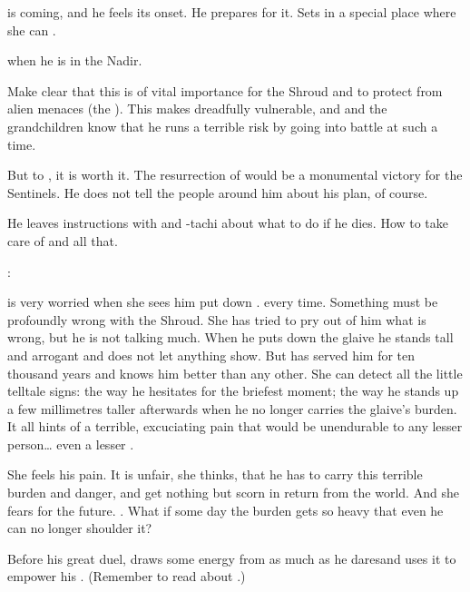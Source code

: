  is coming, and he feels its onset. 
He prepares for it. 
Sets \Rystessakhin{} in a special place where she can . 

\Ishnaruchaefir {} when he is in the Nadir. 

Make clear that this is of vital importance for the Shroud and to protect \Miith{} from alien menaces (the \banes). 
This makes \Ishnaruchaefir{} dreadfully vulnerable, and \Criseis{} and the grandchildren know that he runs a terrible risk by going into battle at such a time. 

But to \Ishnaruchaefir, it is worth it. 
The resurrection of \Nithdornazsh{} would be a monumental victory for the Sentinels. 
He does not tell the people around him about his plan, of course. 

He leaves instructions with \Criseis{} and \Thiencaste-tachi about what to do if he dies. 
How to take care of \Rystessakhin{} and all that. 

\Ishnaruchaefir: 

\Criseis{} is very worried when she sees him put down \Rystessakhin. 
 every time. 
Something must be profoundly wrong with the Shroud. 
She has tried to pry out of him what is wrong, but he is not talking much. 
When he puts down the glaive he stands tall and arrogant and does not let anything show. 
But \Criseis{} has served him for ten thousand years and knows him better than any other. 
She can detect all the little telltale signs: 
the way he hesitates for the briefest moment; the way he stands up a few millimetres taller afterwards when he no longer carries the glaive's burden. 
It all hints of a terrible, excuciating pain that would be unendurable to any lesser person\ldots{} even a lesser \dragon. 

She feels his pain. 
It is unfair, she thinks, that he has to carry this terrible burden and danger, and get nothing but scorn in return from the world. 
And she fears for the future. 
. 
What if some day the burden gets so heavy that even he can no longer shoulder it? 

Before his great duel, \Ishnaruchaefir{} draws some energy from \Rystessakhin \dash as much as he dares\dash and uses it to empower his . 
(Remember to read about .)

